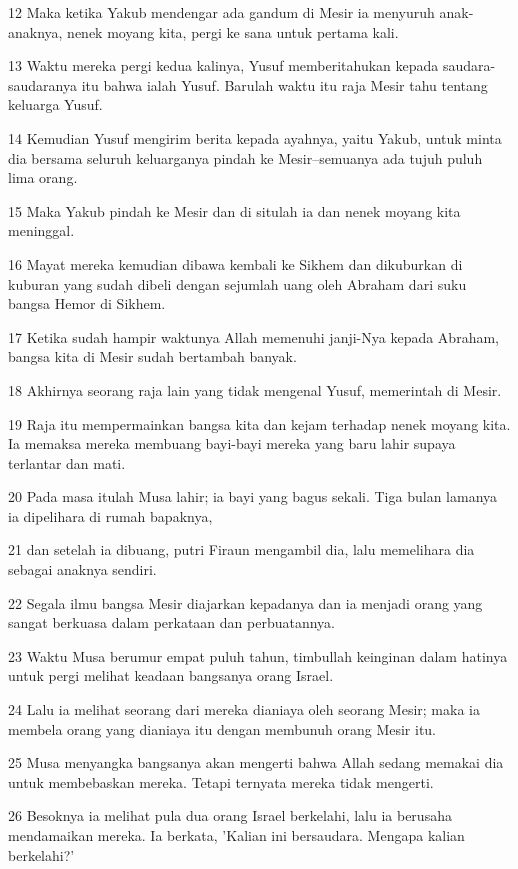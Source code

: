 \par 12 Maka ketika Yakub mendengar ada gandum di Mesir ia menyuruh anak-anaknya, nenek moyang kita, pergi ke sana untuk pertama kali.
\par 13 Waktu mereka pergi kedua kalinya, Yusuf memberitahukan kepada saudara-saudaranya itu bahwa ialah Yusuf. Barulah waktu itu raja Mesir tahu tentang keluarga Yusuf.
\par 14 Kemudian Yusuf mengirim berita kepada ayahnya, yaitu Yakub, untuk minta dia bersama seluruh keluarganya pindah ke Mesir--semuanya ada tujuh puluh lima orang.
\par 15 Maka Yakub pindah ke Mesir dan di situlah ia dan nenek moyang kita meninggal.
\par 16 Mayat mereka kemudian dibawa kembali ke Sikhem dan dikuburkan di kuburan yang sudah dibeli dengan sejumlah uang oleh Abraham dari suku bangsa Hemor di Sikhem.
\par 17 Ketika sudah hampir waktunya Allah memenuhi janji-Nya kepada Abraham, bangsa kita di Mesir sudah bertambah banyak.
\par 18 Akhirnya seorang raja lain yang tidak mengenal Yusuf, memerintah di Mesir.
\par 19 Raja itu mempermainkan bangsa kita dan kejam terhadap nenek moyang kita. Ia memaksa mereka membuang bayi-bayi mereka yang baru lahir supaya terlantar dan mati.
\par 20 Pada masa itulah Musa lahir; ia bayi yang bagus sekali. Tiga bulan lamanya ia dipelihara di rumah bapaknya,
\par 21 dan setelah ia dibuang, putri Firaun mengambil dia, lalu memelihara dia sebagai anaknya sendiri.
\par 22 Segala ilmu bangsa Mesir diajarkan kepadanya dan ia menjadi orang yang sangat berkuasa dalam perkataan dan perbuatannya.
\par 23 Waktu Musa berumur empat puluh tahun, timbullah keinginan dalam hatinya untuk pergi melihat keadaan bangsanya orang Israel.
\par 24 Lalu ia melihat seorang dari mereka dianiaya oleh seorang Mesir; maka ia membela orang yang dianiaya itu dengan membunuh orang Mesir itu.
\par 25 Musa menyangka bangsanya akan mengerti bahwa Allah sedang memakai dia untuk membebaskan mereka. Tetapi ternyata mereka tidak mengerti.
\par 26 Besoknya ia melihat pula dua orang Israel berkelahi, lalu ia berusaha mendamaikan mereka. Ia berkata, 'Kalian ini bersaudara. Mengapa kalian berkelahi?'

